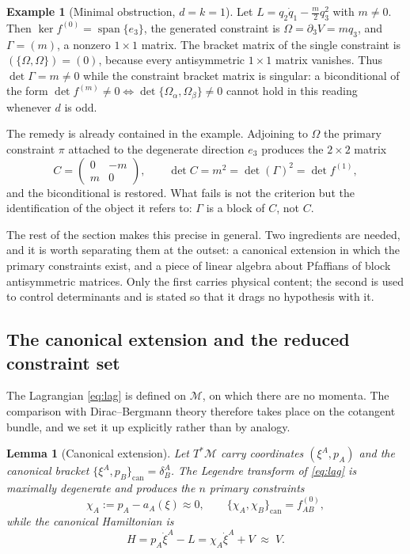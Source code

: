 \documentclass[12pt]{article}
\theoremstyle{plain}
\newtheorem{lemma}[theorem]{Lemma}
\theoremstyle{definition}
\newtheorem{example}[theorem]{Example}
\theoremstyle{remark}
\DeclareMathOperator{\spn}{span}
\newcommand{\pd}[1]{\partial_{#1}}
\newcommand{\Om}{\Omega}
\newcommand{\Mm}{\mathcal{M}}
\begin{document}
	\begin{example}[Minimal obstruction, $d=k=1$]
		\label{ex:d1}
		Let $L=q_{2}\dot q_{1}-\tfrac{m}{2}q_{3}^{2}$ with $m\neq0$. Then
		$\ker f^{(0)}=\spn\{e_{3}\}$, the generated constraint is $\Om=\pd{3}V=mq_{3}$,
		and $\Gamma=(m)$, a nonzero $1\times1$ matrix. The bracket matrix of the single
		constraint is $(\{\Om,\Om\})=(0)$, because every antisymmetric $1\times1$ matrix
		vanishes. Thus $\det\Gamma=m\neq0$ while the constraint bracket matrix is
		singular: a biconditional of the form
		$\det f^{(m)}\neq0\iff\det\{\Om_{\alpha},\Om_{\beta}\}\neq0$ cannot hold in this
		reading whenever $d$ is odd.
		
		The remedy is already contained in the example. Adjoining to $\Om$ the primary
		constraint $\pi$ attached to the degenerate direction $e_{3}$ produces the
		$2\times2$ matrix
		\[
		C=\begin{pmatrix}0&-m\\ m&0\end{pmatrix},
		\qquad
		\det C=m^{2}=\det(\Gamma)^{2}=\det f^{(1)} ,
		\]
		and the biconditional is restored. What fails is not the criterion but the
		identification of the object it refers to: $\Gamma$ is a block of $C$, not $C$.
	\end{example}
	
	The rest of the section makes this precise in general. Two ingredients are
	needed, and it is worth separating them at the outset: a canonical extension in
	which the primary constraints exist, and a piece of linear algebra about
	Pfaffians of block antisymmetric matrices. Only the first carries physical
	content; the second is used to control determinants and is stated so that it
	drags no hypothesis with it.
	
	\subsection{The canonical extension and the reduced constraint set}
	\label{sec:extension}
	
	The Lagrangian \eqref{eq:lag} is defined on $\Mm$, on which there are no momenta.
	The comparison with Dirac--Bergmann theory therefore takes place on the
	cotangent bundle, and we set it up explicitly rather than by analogy.
	
	\begin{lemma}[Canonical extension]
		\label{lem:extension}
		Let $T^{*}\Mm$ carry coordinates $(\xi^{A},p_{A})$ and the canonical bracket
		$\{\xi^{A},p_{B}\}_{\mathrm{can}}=\delta^{A}_{B}$. The Legendre transform of
		\eqref{eq:lag} is maximally degenerate and produces the $n$ primary constraints
		\begin{equation}
			\chi_{A}:=p_{A}-a_{A}(\xi)\approx0,
			\qquad
			\{\chi_{A},\chi_{B}\}_{\mathrm{can}}=f^{(0)}_{AB},
			\label{eq:chi}
		\end{equation}
		while the canonical Hamiltonian is
		\begin{equation}
			H=p_{A}\dot\xi^{A}-L=\chi_{A}\dot\xi^{A}+V\;\approx\;V .
			\label{eq:H}
		\end{equation}
	\end{lemma}
	
\end{document}
